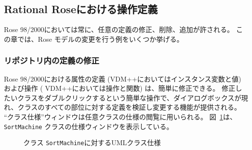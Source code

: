 \documentclass[\pformat,12pt]{jarticle}
\newcommand{\vdmpp}{VDM++}
\newcommand{\rose}{Rose 98/2000}
\begin{document}
\subsection{Rational Roseにおける操作定義} \label{manipulate}
  
\rose{}においては常に、任意の定義の修正、削除、追加が許される。
この章では、Rose モデルの変更を行う例をいくつか挙げる。

\subsubsection*{リポジトリ内の定義の修正}
  
\rose{}における属性の定義 (\vdmpp{}においてはインスタンス変数と値) および操作 ( \vdmpp{}においては操作と関数) は、簡単に修正できる。
修正したいクラスをダブルクリックするという簡単な操作で、ダイアログボックスが現れ、クラスのすべての部位に対する定義を検証し変更する機能が提供される。
``クラス仕様''ウィンドウは任意クラスの仕様の閲覧に用いられる。
図~\ref{fig:classspecification}は、 {\tt SortMachine} クラスの仕様ウィンドウを表示している。

\begin{figure}[htb]
\begin{center}
\mbox{}
\caption{クラス {\tt SortMachine}に対するUMLクラス仕様　\label{fig:classspecification}}
\end{center}
\end{figure}
\end{document}

